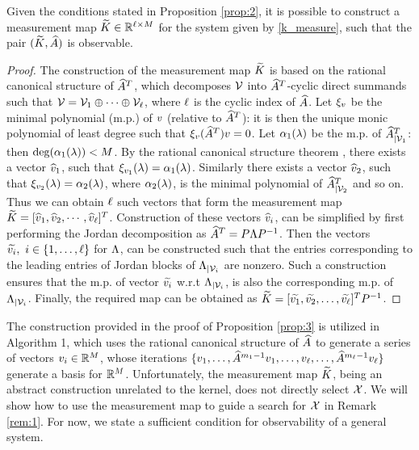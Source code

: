 \begin{proposition}\label{prop:3}
Given the conditions stated in Proposition \ref{prop:2}, it is possible to construct a measurement map $\widetilde{K} \in \mathbb{R}^{\ell\times M}$ for the system given by \eqref{k_measure}, such that the pair $(\widetilde{K}, \widehat{A})$ is observable.
\end{proposition}
\begin{proof}
	The construction of the measurement map $\widetilde{K}$ is based on the rational canonical structure of $\widehat{A}^T$, which decomposes $ \mathcal{V} $ into $\widehat{A}^T$-cyclic direct summands such that $\mathcal{V} = \mathcal{V}_1 \oplus \cdots \oplus \mathcal{V}_\ell$, where $\ell$ is the cyclic index of $\widehat{A}$. Let $\xi_{v}$ be the minimal polynomial (m.p.) of $ v $ (relative to $\widehat{A}^T$): it is then the unique monic polynomial of least degree such that $\xi_{v}(\widehat{A}^T)v=0$. Let $\alpha_1(\lambda)$ be the m.p. of ${\widehat{A}^T}_{|\mathcal{V}_1}$: then $\operatorname{deg}(\alpha_1(\lambda)) < M$. By the rational canonical structure theorem \cite{wonham1974linear}, there exists a vector $\widehat{v}_1$, such that $\xi_{v_1}(\lambda)=\alpha_1(\lambda)$. Similarly there exists a vector $\widehat{v}_2$, such that $\xi_{v_2}(\lambda)=\alpha_2(\lambda)$, where $\alpha_2(\lambda)$, is the minimal polynomial of ${\widehat{A}^T}_{|\mathcal{V}_2}$ and so on. Thus we can obtain $\ell$ such vectors that form the measurement map $\widetilde{K} = [\widehat{v}_1, \widehat{v}_2,\cdots, \widehat{v}_\ell]^T$. Construction of these vectors $\widehat{v}_i$, can be simplified by first performing the Jordan decomposition as $ \widehat{A}^T = P\Lambda P^{-1} $. Then the vectors $ \widetilde{v_i},\ i\in \{1,\dots,\ell\}$ for $ \Lambda $, can be constructed such that the entries corresponding to the leading entries of Jordan blocks of $ \Lambda_{|\mathcal{V}_i} $ are nonzero. Such a construction ensures that the m.p. of vector $ \widetilde{v_i}$ w.r.t $\Lambda_{|\mathcal{V}_i}$, is also the corresponding m.p. of 
	$\Lambda_{|\mathcal{V}_i}$. Finally, the required map can be obtained as $ \widetilde{K} = [\widetilde{v_1}, \widetilde{v_2},\dots,\widetilde{v_\ell}]^TP^{-1}$.
\end{proof}

The construction provided in the proof of Proposition \ref{prop:3} is utilized in Algorithm 1, which uses the rational canonical structure of $\widehat{A}$ to generate a series of vectors $v_i\in\mathbb{R}^{M}$, whose iterations $\{v_1,\dots,\widehat{A}^{m_1-1}v_1,\dots,v_{\ell},\dots,\widehat{A}^{m_{\ell}-1}v_{\ell}\}$ generate a basis for $\mathbb{R}^{M}$.
Unfortunately, the measurement map $\widetilde{K}$, being an abstract construction unrelated to the kernel, does not directly select $\mathcal{X}$. We will show how to use the measurement map to guide a search for $\mathcal{X}$ in Remark \ref{rem:1}. For now, we state a sufficient condition for observability of a general system. 

